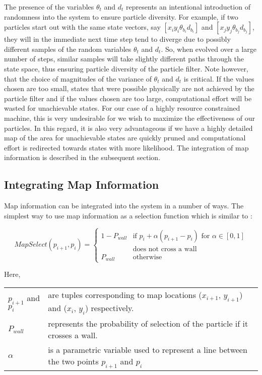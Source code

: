 The presence of the variables $\theta_{t}$ and $d_t$ represents an 
intentional introduction of randomness into the system to ensure 
particle diversity. For example, if two particles start out with the same
state vectors, say 
$ [ x_i y_i \theta_{b_i} d_{b_i} ] $ and 
$ [ x_j y_j \theta_{b_j} d_{b_j} ] $, they will in the immediate 
next time step tend to diverge due to possibly different samples of the 
random variables $\theta_{t}$ and $d_t$. So, 
when evolved over a large number of steps, similar samples will take 
slightly different paths through the state space, thus ensuring particle 
diversity of the particle filter. Note however, that the choice of 
magnitudes of the variance of $\theta_t$ and $d_t$ is critical. If the 
values chosen are too small, states that were possible physically are 
not achieved by the particle filter and if the values chosen are too large,
computational effort will be wasted for unachievable states. For our case 
of a highly resource constrained machine, this is very undesirable for we
wish to maximize the effectiveness of our particles. In this regard, it is 
also very advantageous if we have a highly detailed map of the area for 
unachievable states are quickly pruned and computational effort is 
redirected towards states with more likelihood. The integration of 
map information is described in the subsequent section.

\subsection{Integrating Map Information}

Map information can be integrated into the system in a number 
of ways. The simplest way to use map information as a selection 
function which is similar to \cite{Wang}:

\begin{equation}\label{eq:select}
MapSelect(p_{i+1}, p_i) = \begin{cases}1 - P_{wall} & \text{if $p_i + \alpha (p_{i+1} - p_i)$ for $\alpha \in [0,1]$} \\
                                                    & \text{does not cross a wall}\\
                                    P_{wall} & \text{otherwise}
                          \end{cases}
\end{equation}

Here,\\
\begin{tabular}{p{1.5in} p{3.5in}}
$p_{i+1}$ and $p_i$ &   are tuples corresponding to map locations ($x_{i+1}$, $y_{i+1}$) and ($x_i$, $y_i$) respectively. \\
$P_{wall}$ &   represents the probability of selection of the particle if it crosses a wall. \\
$\alpha$ & is a parametric variable used to represent a line between the two points $p_{i+1}$ and $p_i$ \\
\end{tabular}

